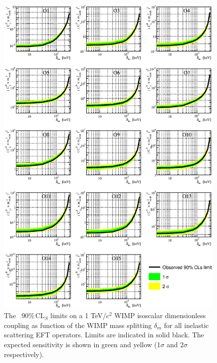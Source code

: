 \begin{figure}
\begin{minipage}{1.\linewidth}
\centerline{\includegraphics[width=\textwidth,height=0.99\textheight,keepaspectratio]{Figures/FinalInelastic.eps}}
\end{minipage}
\caption{The \Xehund\ 90\%\,CL$_S$ limits on a 1 TeV/$c^2$ WIMP isoscalar dimensionless coupling as function of the WIMP mass splitting $\delta_m$  for all inelastic scattering EFT operators. Limits are indicated in solid black. The expected sensitivity is shown in green and yellow (1$\sigma$ and 2$\sigma$ respectively).}
\label{fig:InelasticLimit}
\end{figure}




